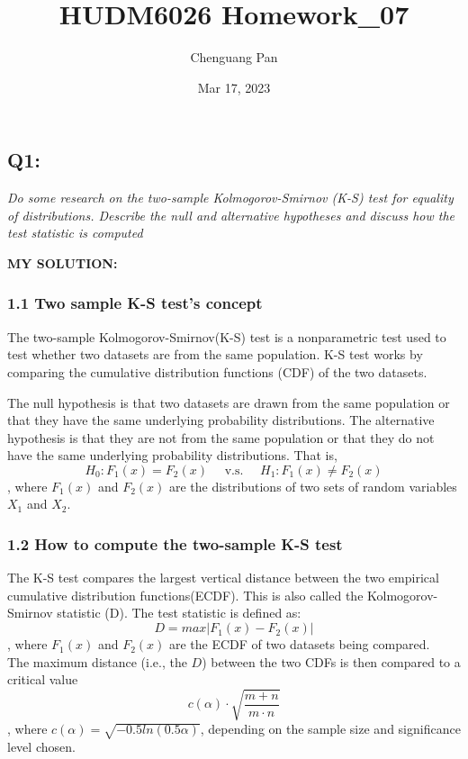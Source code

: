\documentclass[
]{article}
\title{HUDM6026 Homework\_07}
\author{Chenguang Pan}
\date{Mar 17, 2023}
\begin{document}
\maketitle

\hypertarget{q1}{%
\subsection{Q1:}\label{q1}}

\emph{Do some research on the two-sample Kolmogorov-Smirnov (K-S) test
for equality of distributions. Describe the null and alternative
hypotheses and discuss how the test statistic is computed}

\textbf{MY SOLUTION:}

\hypertarget{two-sample-k-s-tests-concept}{%
\subsubsection{1.1 Two sample K-S test's
concept}\label{two-sample-k-s-tests-concept}}

The two-sample Kolmogorov-Smirnov(K-S) test is a nonparametric test used
to test whether two datasets are from the same population. K-S test
works by comparing the cumulative distribution functions (CDF) of the
two datasets.

The null hypothesis is that two datasets are drawn from the same
population or that they have the same underlying probability
distributions. The alternative hypothesis is that they are not from the
same population or that they do not have the same underlying probability
distributions. That is,
\[H_0: F_1(x)=F_2(x) \quad\text{ v.s. }\quad H_1: F_1(x)\neq F_2(x)\],
where \(F_1(x)\) and \(F_2(x)\) are the distributions of two sets of
random variables \(X_1\) and \(X_2\).

\hypertarget{how-to-compute-the-two-sample-k-s-test}{%
\subsubsection{1.2 How to compute the two-sample K-S
test}\label{how-to-compute-the-two-sample-k-s-test}}

The K-S test compares the largest vertical distance between the two
empirical cumulative distribution functions(ECDF). This is also called
the Kolmogorov-Smirnov statistic (D). The test statistic is defined as:
\[D=max|F_1(x)-F_2(x)|\], where \(F_1(x)\) and \(F_2(x)\) are the ECDF
of two datasets being compared.\\
The maximum distance (i.e., the \(D\)) between the two CDFs is then
compared to a critical value
\[c(\alpha)\cdot\sqrt{\frac{m+n}{m\cdot n}}\], where
\(c(\alpha)= \sqrt{-0.5ln(0.5\alpha)}\), depending on the sample size
and significance level chosen.
\end{document}
